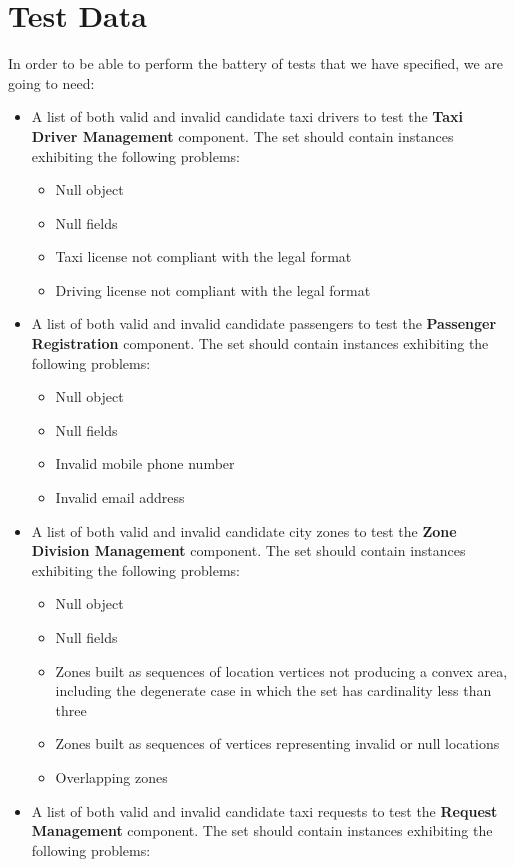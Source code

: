 \section{Test Data}
In order to be able to perform the battery of tests that we have specified, we are going to need:
\begin{itemize}
	\item A list of both valid and invalid candidate taxi drivers to test the \textbf{Taxi Driver Management} component. The set should contain instances exhibiting the following problems: 
		\begin{itemize}
		\item Null object
		\item Null fields
		\item Taxi license not compliant with the legal format
		\item Driving license not compliant with the legal format 
		\end{itemize}
	\item A list of both valid and invalid candidate passengers to test the \textbf{Passenger Registration} component. The set should contain instances exhibiting the following problems: 
	\begin{itemize}
		\item Null object
		\item Null fields
		\item Invalid mobile phone number
		\item Invalid email address
		\end{itemize}
	\item A list of both valid and invalid candidate city zones to test the \textbf{Zone Division Management} component. The set should contain instances exhibiting the following problems: 
	\begin{itemize}
		\item Null object
		\item Null fields
		\item Zones built as sequences of location vertices not producing a convex area, including the degenerate case in which the set has cardinality less than three
		\item Zones built as sequences of vertices representing invalid or null locations
		\item Overlapping zones
		\end{itemize}
	\item A list of both valid and invalid candidate taxi requests to test the \textbf{Request Management} component. The set should contain instances exhibiting the following problems: 

\end{itemize}
